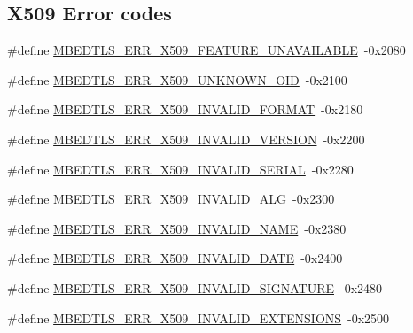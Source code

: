 \subsection*{X509 Error codes}
\begin{DoxyCompactItemize}
\item 
\#define \hyperlink{group__x509__module_ga185bc7f27a2b1f7742537a2377c52ee3}{M\-B\-E\-D\-T\-L\-S\-\_\-\-E\-R\-R\-\_\-\-X509\-\_\-\-F\-E\-A\-T\-U\-R\-E\-\_\-\-U\-N\-A\-V\-A\-I\-L\-A\-B\-L\-E}~-\/0x2080
\item 
\#define \hyperlink{group__x509__module_gab4e8e2e41bfe62e969343efaa2784103}{M\-B\-E\-D\-T\-L\-S\-\_\-\-E\-R\-R\-\_\-\-X509\-\_\-\-U\-N\-K\-N\-O\-W\-N\-\_\-\-O\-I\-D}~-\/0x2100
\item 
\#define \hyperlink{group__x509__module_ga45b8366804b7e2cbf3e25011f054802c}{M\-B\-E\-D\-T\-L\-S\-\_\-\-E\-R\-R\-\_\-\-X509\-\_\-\-I\-N\-V\-A\-L\-I\-D\-\_\-\-F\-O\-R\-M\-A\-T}~-\/0x2180
\item 
\#define \hyperlink{group__x509__module_ga527608dc04b2c831fe5b161ec26aab76}{M\-B\-E\-D\-T\-L\-S\-\_\-\-E\-R\-R\-\_\-\-X509\-\_\-\-I\-N\-V\-A\-L\-I\-D\-\_\-\-V\-E\-R\-S\-I\-O\-N}~-\/0x2200
\item 
\#define \hyperlink{group__x509__module_ga8124a68edabf35ed9323880584128f16}{M\-B\-E\-D\-T\-L\-S\-\_\-\-E\-R\-R\-\_\-\-X509\-\_\-\-I\-N\-V\-A\-L\-I\-D\-\_\-\-S\-E\-R\-I\-A\-L}~-\/0x2280
\item 
\#define \hyperlink{group__x509__module_gae16cddbd42e08f6dd093cf4326e59413}{M\-B\-E\-D\-T\-L\-S\-\_\-\-E\-R\-R\-\_\-\-X509\-\_\-\-I\-N\-V\-A\-L\-I\-D\-\_\-\-A\-L\-G}~-\/0x2300
\item 
\#define \hyperlink{group__x509__module_ga8f61c2f303bf065af4f783e03f952ede}{M\-B\-E\-D\-T\-L\-S\-\_\-\-E\-R\-R\-\_\-\-X509\-\_\-\-I\-N\-V\-A\-L\-I\-D\-\_\-\-N\-A\-M\-E}~-\/0x2380
\item 
\#define \hyperlink{group__x509__module_gac36bf085ce8f7f57f039bda8828bd824}{M\-B\-E\-D\-T\-L\-S\-\_\-\-E\-R\-R\-\_\-\-X509\-\_\-\-I\-N\-V\-A\-L\-I\-D\-\_\-\-D\-A\-T\-E}~-\/0x2400
\item 
\#define \hyperlink{group__x509__module_ga022c175386f082b4e056e6268ee68cab}{M\-B\-E\-D\-T\-L\-S\-\_\-\-E\-R\-R\-\_\-\-X509\-\_\-\-I\-N\-V\-A\-L\-I\-D\-\_\-\-S\-I\-G\-N\-A\-T\-U\-R\-E}~-\/0x2480
\item 
\#define \hyperlink{group__x509__module_gaa0788dbf0325aea4ab566717514b4422}{M\-B\-E\-D\-T\-L\-S\-\_\-\-E\-R\-R\-\_\-\-X509\-\_\-\-I\-N\-V\-A\-L\-I\-D\-\_\-\-E\-X\-T\-E\-N\-S\-I\-O\-N\-S}~-\/0x2500
\item 

\end{DoxyCompactItemize}
